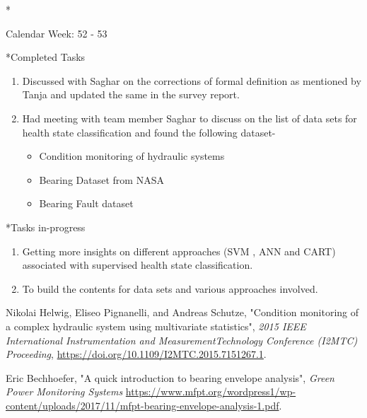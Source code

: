 \documentclass[11pt,a4paper]{article}
\begin{document}
\begin{section}*{Calendar Week: 52 - 53 \hfill \date{30 December, 2020}}

\begin{subsection}*{Completed Tasks}
    \begin{enumerate}
        \item 
            Discussed with Saghar on the corrections of formal definition as mentioned by Tanja and updated the same in the survey report.
        \item
            Had meeting with team member Saghar to discuss on the list of data sets for health state classification and found the following dataset-
            \begin{itemize}
                \item Condition monitoring of hydraulic systems \cite{survey71}  
                \item Bearing Dataset from NASA
                \item Bearing Fault dataset \cite{survey72}
            \end{itemize}
             
    \end{enumerate}
\end{subsection}
\begin{subsection}*{Tasks in-progress}
    \begin{enumerate}
        \item
            Getting more insights on different approaches (SVM , ANN and CART) associated with supervised health state classification.
        \item
            To build the contents for data sets and various approaches involved.
        \end{enumerate}
\end{subsection}
\begin{thebibliography}{9}
    {Nikolai  Helwig,  Eliseo  Pignanelli,  and  Andreas  Schutze},
    "Condition monitoring  of  a  complex  hydraulic  system  using  multivariate  statistics",
    \textit{2015 IEEE International Instrumentation and MeasurementTechnology Conference (I2MTC) Proceeding},
    \href{https://doi.org/10.1109/I2MTC.2015.7151267.1}{https://doi.org/10.1109/I2MTC.2015.7151267.1}. 
    
    {Eric Bechhoefer},
    "A quick introduction to bearing envelope analysis",
    \textit{ Green Power Monitoring Systems}
    \href{https://www.mfpt.org/wordpress1/wp-content/uploads/2017/11/mfpt-bearing-envelope-analysis-1.pdf}{https://www.mfpt.org/wordpress1/wp-content/uploads/2017/11/mfpt-bearing-envelope-analysis-1.pdf}.

    \end{thebibliography}
\end{section}
\end{document}
